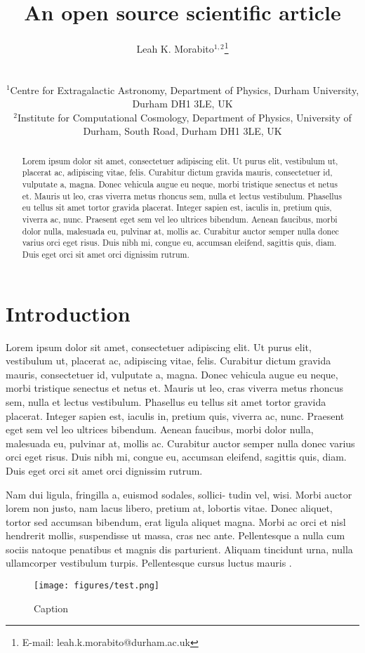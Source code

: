 \documentclass[usenatbib,fleqn]{mnras}
\title[Running head]{An open source scientific article}
\author[L.K. Morabito]{\parbox{\textwidth}{Leah K. Morabito$^{1,2}$\thanks{E-mail: leah.k.morabito@durham.ac.uk}\orcidlink{0000-0003-0487-6651}\\}\\ 
$^{1}$Centre for Extragalactic Astronomy, Department of Physics, Durham University, Durham DH1 3LE, UK \\
$^{2}$Institute for Computational Cosmology, Department of Physics, University of Durham, South Road, Durham DH1 3LE, UK \\ }
\begin{document}
\date{}
\pagerange{\pageref{firstpage}--\pageref{lastpage}} 
\maketitle

\label{firstpage}


\begin{abstract}
    Lorem ipsum dolor sit amet, consectetuer adipiscing elit.
    Ut purus elit, vestibulum ut, placerat ac, adipiscing vitae, felis.
    Curabitur dictum gravida mauris, consectetuer id, vulputate a, magna.
    Donec vehicula augue eu neque, morbi tristique senectus et netus et.
    Mauris ut leo, cras viverra metus rhoncus sem, nulla et lectus vestibulum.
    Phasellus eu tellus sit amet tortor gravida placerat.
    Integer sapien est, iaculis in, pretium quis, viverra ac, nunc.
    Praesent eget sem vel leo ultrices bibendum.
    Aenean faucibus, morbi dolor nulla, malesuada eu, pulvinar at, mollis ac.
    Curabitur auctor semper nulla donec varius orci eget risus.
    Duis nibh mi, congue eu, accumsan eleifend, sagittis quis, diam.
    Duis eget orci sit amet orci dignissim rutrum.
\end{abstract}

\section{Introduction}
\label{sec:intro}

Lorem ipsum dolor sit amet, consectetuer adipiscing elit.
Ut purus elit, vestibulum ut, placerat ac, adipiscing vitae, felis.
Curabitur dictum gravida mauris, consectetuer id, vulputate a, magna.
Donec vehicula augue eu neque, morbi tristique senectus et netus et.
Mauris ut leo, cras viverra metus rhoncus sem, nulla et lectus vestibulum.
Phasellus eu tellus sit amet tortor gravida placerat.
Integer sapien est, iaculis in, pretium quis, viverra ac, nunc.
Praesent eget sem vel leo ultrices bibendum.
Aenean faucibus, morbi dolor nulla, malesuada eu, pulvinar at, mollis ac.
Curabitur auctor semper nulla donec varius orci eget risus.
Duis nibh mi, congue eu, accumsan eleifend, sagittis quis, diam.
Duis eget orci sit amet orci dignissim rutrum.

Nam dui ligula, fringilla a, euismod sodales, sollici- tudin vel, wisi.
Morbi auctor lorem non justo, nam lacus libero, pretium at, lobortis vitae.
Donec aliquet, tortor sed accumsan bibendum, erat ligula aliquet magna.
Morbi ac orci et nisl hendrerit mollis, suspendisse ut massa, cras nec ante.
Pellentesque a nulla cum sociis natoque penatibus et magnis dis parturient.
Aliquam tincidunt urna, nulla ullamcorper vestibulum turpis.
Pellentesque cursus luctus mauris \citep{Luger2021}.

\begin{figure}
    \centering
    \texttt{[image: figures/test.png]}
    \caption{Caption}
    \label{fig:enter-label}
\end{figure}




\label{lastpage}
\end{document}
